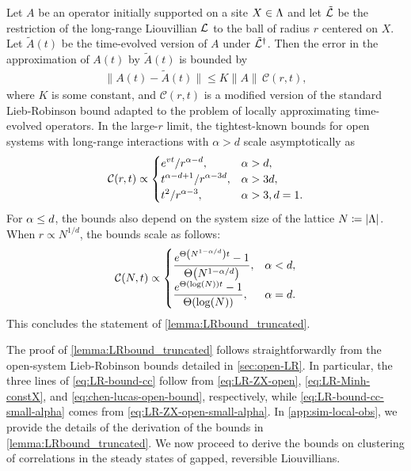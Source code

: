 \begin{lemma}
\label{lemma:LRbound_truncated}
    Let $A$ be an operator initially supported on a site $X\in\Lambda$ and let $\tilde {\mathcal{L}}$ be the restriction of the long-range Liouvillian $\mathcal{L}$ to the ball of radius $r$ centered on $X$.
    Let $\tilde A(t)$ be the time-evolved version of $A$ under $\tilde {\mathcal{L}}^\dag$.
    Then the error in the approximation of $A(t)$ by $\tilde A(t)$ is bounded by
    \begin{align}
    \label{eq:LR-bound-approx}
        \|A(t) - \tilde A(t) \| \le K \|A\|\,\mathcal C(r,t),
    \end{align}
    where $K$ is some constant, and $\mathcal C(r,t)$ is a modified version of the standard Lieb-Robinson bound adapted to the problem of locally approximating time-evolved operators.
    In the large-$r$ limit, the tightest-known bounds for open systems with long-range interactions with $\alpha > d$ scale asymptotically as
    \begin{equation}
      \label{eq:LR-bound-cc}
      \displaystyle
      \mathcal C(r,t) \propto \begin{cases} \displaystyle
            e^{vt}/r^{\alpha-d},& \alpha > d,
        \\
        \displaystyle t^{\alpha-d+1}/r^{\alpha-3d}
        , & \alpha > 3d,
        \\ \displaystyle t^2/r^{\alpha-3},& \alpha > 3, d=1.
      \end{cases}
    \end{equation}
    For $\alpha \le d$, the bounds also depend on the system size of the lattice $N\coloneqq|\Lambda|$.
    When $r \propto N^{1/d}$, the bounds scale as follows:
    \begin{equation}
      \label{eq:LR-bound-cc-small-alpha}
      \mathcal C(N,t) \propto \begin{cases}
        \ds\frac{e^{\Th{N^{1-\al/d}}t}-1}{\Th{N^{1-\al/d}}},& \al < d,
        \\
        \ds\frac{e^{\Th{\log(N)}t}-1}{\Th{\log(N)}},& \al= d.
      \end{cases}
    \end{equation}
    This concludes the statement of \cref{lemma:LRbound_truncated}.
\end{lemma}
The proof of \cref{lemma:LRbound_truncated} follows straightforwardly from the open-system Lieb-Robinson bounds detailed in \cref{sec:open-LR}.
In particular, the three lines of \cref{eq:LR-bound-cc} follow from \cref{eq:LR-ZX-open}, \cref{eq:LR-Minh-constX}, and \cref{eq:chen-lucas-open-bound}, respectively,
while \cref{eq:LR-bound-cc-small-alpha} comes from \cref{eq:LR-ZX-open-small-alpha}.
In \cref{app:sim-local-obs}, we provide the details of the derivation of the bounds in \cref{lemma:LRbound_truncated}.
We now proceed to derive the bounds on clustering of correlations in the steady states of gapped, reversible Liouvillians.

